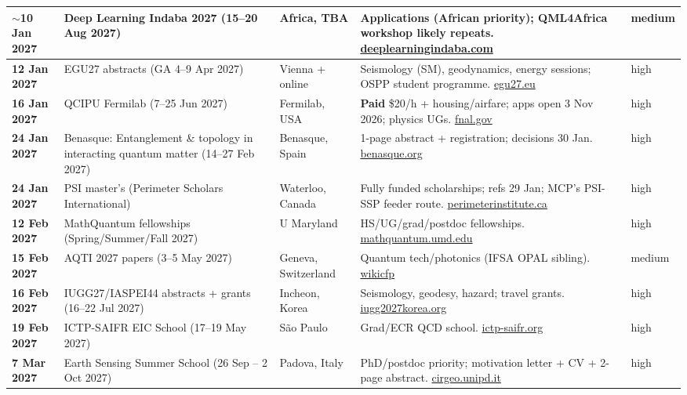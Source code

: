 \documentclass[11pt,a4paper]{article}
\begin{document}
\begin{longtable}{@{}p{3.2cm}p{3.0cm}p{2.5cm}p{5.2cm}p{1.6cm}@{}}
\midrule
\textbf{$\sim$10 Jan 2027} & Deep Learning Indaba 2027 (15--20 Aug 2027) & Africa, TBA & Applications (African priority); QML4Africa workshop likely repeats. \href{https://deeplearningindaba.com/}{deeplearningindaba.com} & medium \\
\midrule
\textbf{12 Jan 2027} & EGU27 abstracts (GA 4--9 Apr 2027) & Vienna + online & Seismology (SM), geodynamics, energy sessions; OSPP student programme. \href{https://www.egu27.eu/}{egu27.eu} & high \\
\midrule
\textbf{16 Jan 2027} & QCIPU Fermilab (7--25 Jun 2027) & Fermilab, USA & \textbf{Paid} \$20/h + housing/airfare; apps open 3 Nov 2026; physics UGs. \href{https://internships.fnal.gov/quantum-computing-internship-for-physics-undergraduates-program/}{fnal.gov} & high \\
\midrule
\textbf{24 Jan 2027} & Benasque: Entanglement \& topology in interacting quantum matter (14--27 Feb 2027) & Benasque, Spain & 1-page abstract + registration; decisions 30 Jan. \href{https://www.benasque.org/2027etqm/}{benasque.org} & high \\
\midrule
\textbf{24 Jan 2027} & PSI master's (Perimeter Scholars International) & Waterloo, Canada & Fully funded scholarships; refs 29 Jan; MCP's PSI-SSP feeder route. \href{https://perimeterinstitute.ca/training/masters-program/psi-how-apply}{perimeterinstitute.ca} & high \\
\midrule
\textbf{12 Feb 2027} & MathQuantum fellowships (Spring/Summer/Fall 2027) & U Maryland & HS/UG/grad/postdoc fellowships. \href{https://mathquantum.umd.edu/apply/}{mathquantum.umd.edu} & high \\
\midrule
\textbf{15 Feb 2027} & AQTI 2027 papers (3--5 May 2027) & Geneva, Switzerland & Quantum tech/photonics (IFSA OPAL sibling). \href{http://www.wikicfp.com/cfp/servlet/event.showcfp?copyownerid=93289&eventid=203156}{wikicfp} & medium \\
\midrule
\textbf{16 Feb 2027} & IUGG27/IASPEI44 abstracts + grants (16--22 Jul 2027) & Incheon, Korea & Seismology, geodesy, hazard; travel grants. \href{https://iugg2027korea.org/?hl=ENG}{iugg2027korea.org} & high \\
\midrule
\textbf{19 Feb 2027} & ICTP-SAIFR EIC School (17--19 May 2027) & São Paulo & Grad/ECR QCD school. \href{https://www.ictp-saifr.org/seic2027/}{ictp-saifr.org} & high \\
\midrule
\textbf{7 Mar 2027} & Earth Sensing Summer School (26 Sep -- 2 Oct 2027) & Padova, Italy & PhD/postdoc priority; motivation letter + CV + 2-page abstract. \href{https://www.cirgeo.unipd.it/est/earth-sensing-summer-school.html/index2027.html}{cirgeo.unipd.it} & high \\

\end{longtable}
\end{document}
